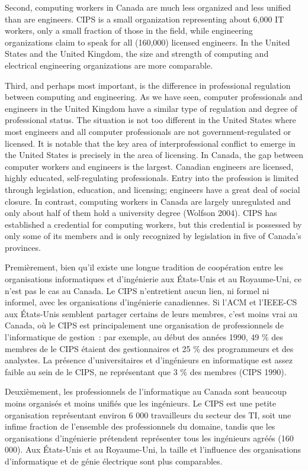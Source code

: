 {{\item [][---] Second, computing workers in Canada are much less organized and less unified than are engineers. CIPS is a small organization representing about 6,000 IT workers, only a small fraction of those in the field, while engineering organizations claim to speak for all (160,000) licensed engineers. In the United States and the United Kingdom, the size and strength of computing and electrical engineering organizations are more comparable.
\item [][---] Third, and perhaps most important, is the difference in professional regulation between computing and engineering. As we have seen, computer professionals and engineers in the United Kingdom have a similar type of regulation and degree of professional status. The situation is not too different in the United States where most engineers and all computer professionals are not government-regulated or licensed. It is notable that the key area of interprofessional conflict to emerge in the United States is precisely in the area of licensing. In Canada, the gap between computer workers and engineers is the largest. Canadian engineers are licensed, highly educated, self-regulating professionals. Entry into the profession is limited through legislation, education, and licensing; engineers have a great deal of social closure. In contrast, computing workers in Canada are largely unregulated and only about half of them hold a university degree (Wolfson 2004). CIPS has established a credential for computing workers, but this credential is possessed by only some of its members and is only recognized by legislation in five of Canada’s provinces.
}{
\item [][---] Premièrement, bien qu'il existe une longue tradition de coopération entre les organisations informatiques et d'ingénierie aux États-Unis et au Royaume-Uni, ce n'est pas le cas au Canada. Le CIPS n'entretient aucun lien, ni formel ni informel, avec les organisations d'ingénierie canadiennes. Si l'ACM et l'IEEE-CS aux États-Unis semblent partager certains de leurs membres, c'est moins vrai au Canada, où le CIPS est principalement une organisation de professionnels de l'informatique de gestion~: par exemple, au début des années 1990, 49 \% des membres de le CIPS étaient des gestionnaires et 25 \% des programmeurs et des analystes. La présence d'universitaires et d'ingénieurs en informatique est assez faible au sein de le CIPS, ne représentant que 3 \% des membres (CIPS 1990).
\item [][---] Deuxièmement, les professionnels de l'informatique au Canada sont beaucoup moins organisés et moins unifiés que les ingénieurs. Le CIPS est une petite organisation représentant environ 6 000 travailleurs du secteur des TI, soit une infime fraction de l'ensemble des professionnels du domaine, tandis que les organisations d'ingénierie prétendent représenter tous les ingénieurs agréés (160 000). Aux États-Unis et au Royaume-Uni, la taille et l'influence des organisations d'informatique et de génie électrique sont plus comparables.
}}
